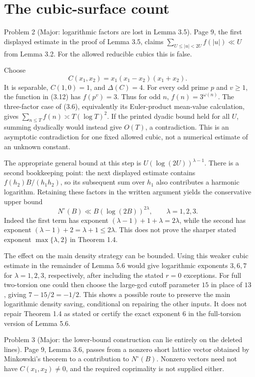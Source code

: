 \documentclass[10pt]{article}
\begin{document}
\section*{The cubic-surface count}
Problem 2 (Major: logarithmic factors are lost in Lemma 3.5).  Page 9, the first displayed estimate in the proof of Lemma 3.5, claims \(\sum_{U\leq|u|<2U}f(|u|)\ll U\) from Lemma 3.2. For the allowed reducible cubics this is false.\par
Choose \[C(x_1,x_2)=x_1(x_1-x_2)(x_1+x_2).\] It is separable, \(C(1,0)=1\), and \(\Delta(C)=4\). For every odd prime \(p\) and \(v\geq1\), the function in (3.12) has \(f(p^v)=3\). Thus for odd \(n\), \(f(n)=3^{\omega(n)}\). The three-factor case of (3.6), equivalently its Euler-product mean-value calculation, gives \(\sum_{n\leq T}f(n)\asymp T(\log T)^2\). If the printed dyadic bound held for all \(U\), summing dyadically would instead give \(O(T)\), a contradiction. This is an asymptotic contradiction for one fixed allowed cubic, not a numerical estimate of an unknown constant.\par
The appropriate general bound at this step is \(U(\log(2U))^{\lambda-1}\). There is a second bookkeeping point: the next displayed estimate contains \(f(h_2)B/(h_1h_2)\), so its subsequent sum over \(h_1\) also contributes a harmonic logarithm. Retaining these factors in the written argument yields the conservative upper bound \[N^\circ(B)\ll B(\log(2B))^{2\lambda},\qquad \lambda=1,2,3.\] Indeed the first term has exponent \((\lambda-1)+1+\lambda=2\lambda\), while the second has exponent \((\lambda-1)+2=\lambda+1\leq2\lambda\). This does not prove the sharper stated exponent \(\max\{\lambda,2\}\) in Theorem 1.4.\par
The effect on the main density strategy can be bounded. Using this weaker cubic estimate in the remainder of Lemma 5.6 would give logarithmic exponents \(3,6,7\) for \(\lambda=1,2,3\), respectively, after including the stated \(r=0\) exceptions. For full two-torsion one could then choose the large-gcd cutoff parameter \(15\) in place of \(13\), giving \(7-15/2=-1/2\). This shows a possible route to preserve the main logarithmic density saving, conditional on repairing the other inputs. It does not repair Theorem 1.4 as stated or certify the exact exponent \(6\) in the full-torsion version of Lemma 5.6.\par
Problem 3 (Major: the lower-bound construction can lie entirely on the deleted lines).  Page 9, Lemma 3.6, passes from a nonzero short lattice vector obtained by Minkowski’s theorem to a contribution to \(N^\circ(B)\). Nonzero vectors need not have \(C(x_1,x_2)\neq0\), and the required coprimality is not supplied either.\par
\end{document}

